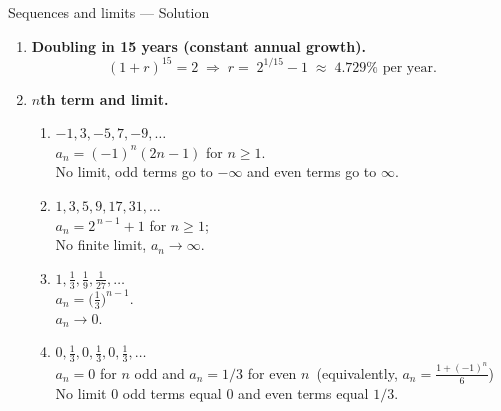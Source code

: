 \documentclass[9pt]{beamer}
\begin{document}
\begin{frame}{Sequences and limits — Solution}
\footnotesize
\begin{enumerate}[leftmargin=0.5cm, label=\arabic*., rightmargin=0.2cm]

  \item \textbf{Doubling in 15 years (constant annual growth).}
  \[
    (1+r)^{15}=2 \;\Longrightarrow\; r=\;2^{1/15}-1\;\approx\;\boxed{4.729\%\text{ per year}}.
  \]

  \item \textbf{$n$th term and limit.}
  \begin{enumerate}[leftmargin=0.5cm, label=(\alph*), rightmargin=0.2cm]
    \item $-1,3,-5,7,-9,\dots$ \\
          \(\displaystyle a_n=(-1)^n(2n-1)\) for $n\geq 1$. \\ 
          No limit, odd terms go to $-\infty$ and even terms go to $\infty$.

    \item $1,3,5,9,17,31,\dots$ \\
          \(\displaystyle a_n=2^{\,n-1}+1\) for \(n\ge1\); \\
          No finite limit, $a_n \rightarrow \infty$.

    \item $1,\tfrac13,\tfrac19,\tfrac1{27},\dots$ \\
          \(\displaystyle a_n=\bigl(\tfrac13\bigr)^{n-1}\). \\
          $a_n \rightarrow 0$.


    \item $0,\tfrac13,0,\tfrac13,0,\tfrac13,\dots$ \\
          $a_n = 0$ for $n$ odd and $a_n = 1/3$ for even $n$\, (equivalently, \(\displaystyle a_n=\frac{1+(-1)^n}{6}\)) \\
          No limit \(0\) odd terms equal $0$ and even terms equal $1/3$.

  \end{enumerate}

\end{enumerate}
\end{frame}
\end{document}
